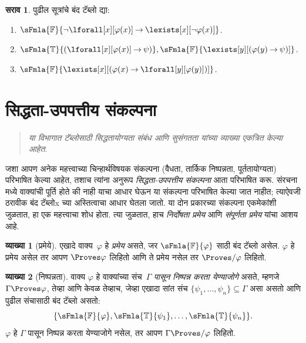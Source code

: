 \documentclass[11pt,a4paper,openany]{book}
\theoremstyle{definition}
\newtheorem{defn}{व्याख्या}[section]
\newtheorem{prob}{सराव}[chapter]
\newenvironment{explain}{}{}
\newcommand{\lif}{\mathbin{\to}}
\newenvironment{editorial}{\begin{quote}\small\itshape}{\end{quote}}
\newcommand{\True}{\ensuremath{\mathbb{T}}}
\newcommand{\False}{\ensuremath{\mathbb{F}}}
\begin{document}
\begin{prob}
पुढील सूत्रांचे बंद टॅब्लो द्या:
\begin{enumerate}
\item $\sFmla{\False}{\lnot\lforall[x][\varphi(x)] \lif \lexists[x][\lnot\varphi(x)]}$.
\item $\sFmla{\True}{(\lforall[x][\varphi(x)] \lif \psi)}, \sFmla{\False}{\lexists[y][(\varphi(y) \lif \psi)]}$.
\item $\sFmla{\False}{\lexists[x][(\varphi(x) \lif \lforall[y][\varphi(y)])]}$.
\end{enumerate}
\end{prob}












\section{सिद्धता-उपपत्तीय संकल्पना}\label{fol:tab:ptn:sec}

\begin{editorial}
या विभागात टॅब्लोसाठी सिद्धतायोग्यता संबंध आणि सुसंगतता यांच्या व्याख्या
एकत्रित केल्या आहेत.
\end{editorial}

\begin{explain}
जशा आपण अनेक महत्त्वाच्या चिन्हार्थविषयक संकल्पना (वैधता, तार्किक निष्पन्नता,
पूर्ततायोग्यता) परिभाषित केल्या आहेत, तशाच त्यांना अनुरूप
\emph{सिद्धता-उपपत्तीय संकल्पना} आता परिभाषित करू. संरचना मध्ये
वाक्यांची पूर्ति होते की नाही याचा आधार घेऊन या संकल्पना परिभाषित
केल्या जात नाहीत; त्याऐवजी ठरावीक बंद टॅब्लोx च्या अस्तित्वाचा आधार
घेतला जातो. या दोन प्रकारच्या संकल्पना एकमेकांशी जुळतात, हा एक महत्त्वाचा
शोध होता. त्या जुळतात, हाच \emph{निर्दोषता प्रमेय} आणि
\emph{संपूर्णता प्रमेय} यांचा आशय आहे.
\end{explain}


\begin{defn}[प्रमेये]
एखादे वाक्य~$\varphi$ हे \emph{प्रमेय} असते, जर
$\sFmla{\False}{\varphi}$ साठी बंद टॅब्लो असेल. $\varphi$ हे प्रमेय असेल
तर आपण $\Proves \varphi$ लिहितो आणि ते प्रमेय नसेल तर $\Proves/ \varphi$ लिहितो.
\end{defn}

\begin{defn}[निष्पन्नता]
वाक्य $\varphi$ हे वाक्यांच्या संच~$\Gamma$ \emph{पासून
निष्पन्न करता येण्याजोगे} असते, म्हणजे $\Gamma \Proves \varphi$, तेव्हा आणि केवळ तेव्हाच,
जेव्हा एखादा सांत संच $\{\psi_1, \dots, \psi_n\} \subseteq \Gamma$ असा असतो
आणि पुढील संचासाठी बंद टॅब्लो असतो:
\[
\{
  \sFmla{\False}{\varphi},
  \sFmla{\True}{\psi_1}, \dots,
  \sFmla{\True}{\psi_n}
  \}.
\]
$\varphi$ हे $\Gamma$ पासून निष्पन्न करता येण्याजोगे नसेल, तर आपण $\Gamma \Proves/
\varphi$ लिहितो.
\end{defn}
\end{document}
